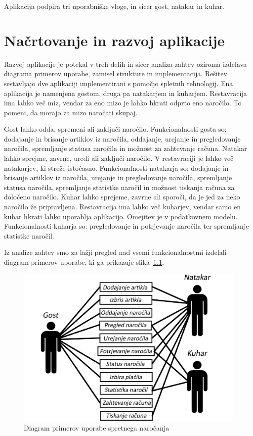 \documentclass[a4paper, 12pt]{book}
\begin{document}
Aplikacija podpira tri uporabniške vloge, in sicer gost, natakar in kuhar. 

\chapter{Načrtovanje in razvoj aplikacije}

Razvoj aplikacije je potekal v treh delih in sicer analiza zahtev oziroma izdelava diagrama primerov uporabe, zamisel strukture in implementacija.
Rešitev sestavljajo dve aplikaciji implementirani s pomočjo spletnih tehnologij. Ena aplikacija je namenjena gostom, druga pa natakarjem in kuharjem. Restavracija ima lahko več miz, vendar za eno mizo je lahko hkrati odprto eno naročilo. To pomeni, da morajo za mizo naročati skupaj. 

Gost lahko odda, spremeni ali zaključi naročilo. Funkcionalnosti gosta so: dodajanje in brisanje artiklov iz naročila, oddajanje, urejanje in pregledovanje naročila, spremljanje statusa naročila in možnost za zahtevanje računa. Natakar lahko sprejme, zavrne, uredi ali zaključi naročilo. V restavraciji je lahko več natakarjev, ki streže istočasno. Funkcionalnosti natakarja so: dodajanje in brisanje artiklov iz naročila, urejanje in pregledovanje naročila, spremljanje statusa naročila, spremljanje statistke naročil in možnost tiskanja računa za določeno naročilo. Kuhar lahko sprejeme, zavrne ali sporoči, da je jed za neko naročilo že pripravljena. Restavracija ima lahko več kuharjev, vendar samo en kuhar hkrati lahko uporablja aplikacijo. Omejitev je v podatkovnem modelu. Funkcionalnosti kuharja so: pregledovanje in potrjevanje naročila ter spremljanje statistke naročil.

Iz analize zahtev smo za lažji pregled nad vsemi funkcionalnostmi izdelali diagram primerov uporabe, ki ga prikazuje slika~\ref{FunkVloge}.

\begin{figure}[!htb]
\begin{center}
\includegraphics[width=11.5cm]{Skica2.png}
\caption{Diagram primerov uporabe spretnega naročanja}
\label{FunkVloge}
\end{center}
\end{figure}
\end{document}

